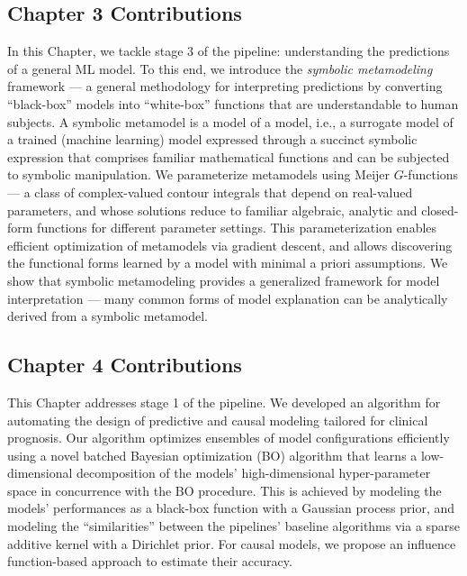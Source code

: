 \documentclass [PhD] {uclathes}
\begin{document}
\subsection*{Chapter 3 Contributions}
In this Chapter, we tackle stage 3 of the pipeline: understanding the predictions of a general ML model. To this end, we introduce the \textit{symbolic metamodeling} framework --- a general methodology for interpreting predictions by converting ``black-box'' models into ``white-box'' functions that are understandable to human subjects. A symbolic metamodel is a model of a model, i.e., a surrogate model of a trained (machine learning) model expressed through a succinct symbolic expression that comprises familiar mathematical functions and can be subjected to symbolic manipulation. We parameterize metamodels using Meijer $G$-functions --- a class of complex-valued contour integrals that depend on real-valued parameters, and whose solutions reduce to familiar algebraic, analytic and closed-form functions for different parameter settings. This parameterization enables efficient optimization of metamodels via gradient descent, and allows discovering the functional forms learned by a model with minimal a priori assumptions. We show that symbolic metamodeling provides a generalized framework for model interpretation — many common forms of model explanation can be analytically derived from a symbolic metamodel.

\subsection*{Chapter 4 Contributions}
This Chapter addresses stage 1 of the pipeline. We developed an algorithm for automating the design of predictive and causal modeling tailored for clinical prognosis. Our algorithm optimizes ensembles of model configurations efficiently using a novel batched Bayesian optimization (BO) algorithm that learns a low-dimensional decomposition of the models' high-dimensional hyper-parameter space in concurrence with the BO procedure. This is achieved by modeling the models' performances as a black-box function with a Gaussian process prior, and modeling the ``similarities'' between the pipelines' baseline algorithms via a sparse additive kernel with a Dirichlet prior. For causal models, we propose an influence function-based approach to estimate their accuracy.
\end{document}
